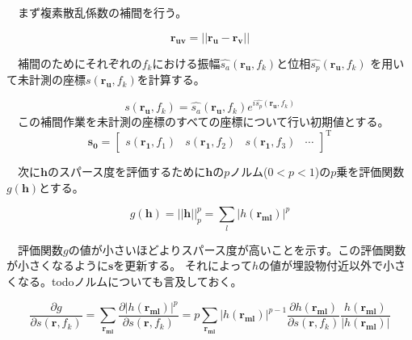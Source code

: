\documentclass[12pt,a4paper]{jsreport}
\begin{document}
　まず複素散乱係数の補間を行う。

\begin{equation}
  \bm{r_{uv}} =
  ||\bm{r_{u}}-\bm{r_{v}}||
      \label{uvdistance}
  \end{equation}
  
　補間のためにそれぞれの$f_{k}$における振幅$\hat{s_{a}}(\bm{r_{u}},f_{k})$と位相$\hat{s_{p}}(\bm{r_{u}},f_{k})$
を用いて未計測の座標$s(\bm{r_{u}},f_{k})$を計算する。

\begin{equation}
  s(\bm{r_{u}},f_{k})=
  \hat{s_{a}}(\bm{r_{u}},f_{k})e^{i\hat{s_{p}}(\bm{r_{u}},f_{k})}
      \label{s_interpolate}
  \end{equation}
　この補間作業を未計測の座標のすべての座標について行い初期値とする。
\begin{equation}
  \bm{s_{0}} = 
  \left[
      \begin{array}{rrrr}
      s(\bm{r_{1}},f_{1})&s(\bm{r_{1}},f_{2})&s(\bm{r_{1}},f_{3})&\cdots
      \end{array}
      \right]^\mathrm{T}
      \label{defines0}
  \end{equation}

  　次に$\bm{h}$のスパース度を評価するために$\bm{h}$の$p$ノルム($0<p<1$)の$p$乗を評価関数$g(\bm{h})$とする。

  \begin{equation}
    g(\bm{h}) 
    = ||\bm{h}||_{p}^{p}
    = \sum_{l} |h(\bm{r_{ml}})|^{p}
        \label{評価関数}
    \end{equation}

  　評価関数$g$の値が小さいほどよりスパース度が高いことを示す。この評価関数が小さくなるように$\bm{s}$を更新する。
  それによって$h$の値が埋設物付近以外で小さくなる。todoノルムについても言及しておく。


  \begin{equation}
    \frac{\partial g}{\partial s(\bm{r},f_{k})}
    = \sum_{\bm{r_{ml}}}  \frac{\partial |h(\bm{r_{ml}})|^{p} }{\partial s(\bm{r},f_{k})}
    =p \sum_{\bm{r_{ml}}} |h(\bm{r_{ml}})|^{p-1} \frac{\partial h(\bm{r_{ml}}) }{\partial s(\bm{r},f_{k})}  \frac{ h(\bm{r_{ml}}) }{ |h(\bm{r_{ml}}) |}
        \label{gの微分}
    \end{equation}
\end{document}

